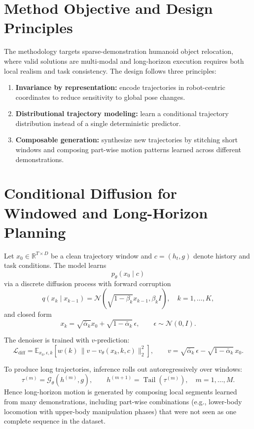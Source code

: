 \section{Method Objective and Design Principles}

The methodology targets sparse-demonstration humanoid object relocation, where valid solutions are multi-modal and long-horizon execution requires both local realism and task consistency. The design follows three principles:
\begin{enumerate}
    \item \textbf{Invariance by representation:} encode trajectories in robot-centric coordinates to reduce sensitivity to global pose changes.
    \item \textbf{Distributional trajectory modeling:} learn a conditional trajectory distribution instead of a single deterministic predictor.
    \item \textbf{Composable generation:} synthesize new trajectories by stitching short windows and composing part-wise motion patterns learned across different demonstrations.
\end{enumerate}

\section{Conditional Diffusion for Windowed and Long-Horizon Planning}

Let $x_0\in\mathbb{R}^{T\times D}$ be a clean trajectory window and $c=(h_t,g)$ denote history and task conditions. The model learns
\[
p_{\theta}(x_0\mid c)
\]
via a discrete diffusion process with forward corruption
\[
q(x_k\mid x_{k-1})=\mathcal{N}(\sqrt{1-\beta_k}x_{k-1},\beta_k I), \quad k=1,\dots,K,
\]
and closed form
\[
x_k=\sqrt{\bar\alpha_k}x_0+\sqrt{1-\bar\alpha_k}\,\epsilon,\qquad \epsilon\sim\mathcal{N}(0,I).
\]

The denoiser is trained with $v$-prediction:
\[
\mathcal{L}_{\mathrm{diff}}=\mathbb{E}_{x_0,\epsilon,k}\left[w(k)\,\|v-v_{\theta}(x_k,k,c)\|_2^2\right],
\qquad
v=\sqrt{\bar\alpha_k}\,\epsilon-\sqrt{1-\bar\alpha_k}\,x_0.
\]

To produce long trajectories, inference rolls out autoregressively over windows:
\[
\tau^{(m)}=\mathcal{G}_{\theta}(h^{(m)},g),
\qquad
h^{(m+1)}=\operatorname{Tail}(\tau^{(m)}),
\quad m=1,\dots,M.
\]
Hence long-horizon motion is generated by composing local segments learned from many demonstrations, including part-wise combinations (e.g., lower-body locomotion with upper-body manipulation phases) that were not seen as one complete sequence in the dataset.

